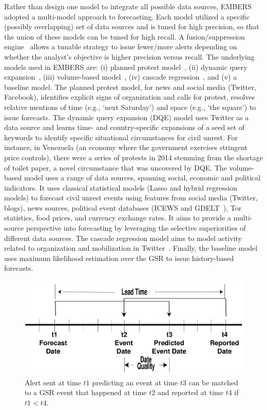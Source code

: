 Rather than design one model to integrate all possible data sources, EMBERS adopted a multi-model
approach to forecasting. Each model utilized a specific (possibly overlapping) set of data sources
and is tuned for high precision, so that the union of these models can be tuned for high recall.
A fusion/suppression engine~\cite{andy-scotland-paper} allows a tunable strategy to issue fewer/more
alerts depending on whether the analyst's objective is higher precision versus recall. The
underlying models used in EMBERS are: (i) planned protest model~\cite{pp-paper1,pp-paper2},
(ii) dynamic query expansion~\cite{dqe-plosone}, (iii) volume-based model~\cite{asonam},
(iv) cascade regression~\cite{anil-plosone}, and (v) a baseline model. The planned protest model,
for news and social media (Twitter, Facebook), identifies explicit signs of organization and calls
for protest, resolves relative mentions of time (e.g., `next Saturday') and space (e.g., `the square')
to issue forecasts. The dynamic query expansion (DQE) model uses Twitter as a data source and learns time- and country-specific
expansions of a seed set of keywords to identify specific situational circumstances for civil unrest.
For instance, in Venezuela (an economy where the government exercises stringent price controls),
there were a series of protests in 2014 stemming from the shortage of toilet paper, a novel circumstance
that was uncovered by DQE. The volume-based model uses a range of data sources, spanning
social, economic
and political indicators. It uses classical statistical models (Lasso
and hybrid regression models) to forecast civil unrest events using features
from social media (Twitter, blogs), news sources,
political event databases (ICEWS and GDELT~\cite{gdelt}), Tor~\cite{tor} statistics, food prices, and currency
exchange rates. It aims to provide a multi-source perspective into forecasting by leveraging
the selective superiorities of different data sources. The cascade regression model
aims to model activity related to organization and mobilization in Twitter~\cite{anil-plosone}.
Finally, the baseline model uses maximum likelihood
estimation over the GSR to issue history-based forecasts.

\begin{figure}
\includegraphics[width=\columnwidth]{figures/cu/timeline.pdf}
\caption{Alert sent at time $t1$ predicting an event at time $t3$
can be matched to a GSR event that happened at time $t2$ and reported
at time $t4$ if $t1 < t4$.}
\label{fig:leadtime}
\end{figure}


